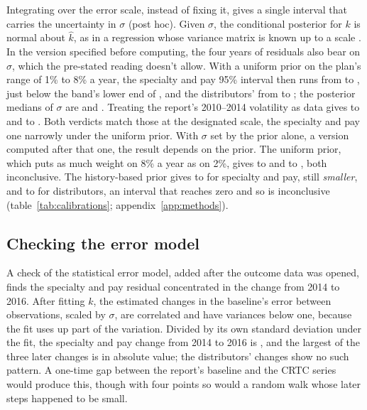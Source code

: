 Integrating over the error scale, instead of fixing it, gives a single interval that carries the uncertainty in \(\sigma\) (post hoc). Given \(\sigma\), the conditional posterior for \(k\) is normal about \(\hat k\), as in a regression whose variance matrix is known up to a scale \citep[372]{GelmanBDA3}. In the version specified before computing, the four years of residuals also bear on \(\sigma\), which the pre-stated reading doesn't allow. With a uniform prior on the plan's range of 1\% to 8\% a year, the specialty and pay 95\% interval then runs from \lttvKIntSpecUnifLo{} to \lttvKIntSpecUnifHi{}, just below the band's lower end of \lttvBandSpecLo{}, and the distributors' from \lttvKIntBDUUnifLo{} to \lttvKIntBDUUnifHi{}; the posterior medians of \(\sigma\) are \lttvKIntSpecUnifSigmaMed{} and \lttvKIntBDUUnifSigmaMed{}. Treating the report's 2010--2014 volatility as data gives \lttvKIntSpecHistLo{} to \lttvKIntSpecHistHi{} and \lttvKIntBDUHistLo{} to \lttvKIntBDUHistHi{}. Both verdicts match those at the designated scale, the specialty and pay one narrowly under the uniform prior. With \(\sigma\) set by the prior alone, a version computed after that one, the result depends on the prior. The uniform prior, which puts as much weight on 8\% a year as on 2\%, gives \lttvKIntSpecUnifOnlyLo{} to \lttvKIntSpecUnifOnlyHi{} and \lttvKIntBDUUnifOnlyLo{} to \lttvKIntBDUUnifOnlyHi{}, both inconclusive. The history-based prior gives \lttvKIntSpecHistOnlyLo{} to \lttvKIntSpecHistOnlyHi{} for specialty and pay, still \emph{smaller}, and \lttvKIntBDUHistOnlyLo{} to \lttvKIntBDUHistOnlyHi{} for distributors, an interval that reaches zero and so is inconclusive (table~\ref{tab:calibrations}; appendix~\ref{app:methods}).

\subsection{Checking the error model}
\label{sec:lttv-modelcheck}

A check of the statistical error model, added after the outcome data was opened, finds the specialty and pay residual concentrated in the change from 2014 to 2016. After fitting \(k\), the estimated changes in the baseline's error between observations, scaled by \(\sigma\), are correlated and have variances below one, because the fit uses up part of the variation. Divided by its own standard deviation under the fit, the specialty and pay change from 2014 to 2016 is \lttvInnovSpecFirst{}, and the largest of the three later changes is \lttvInnovSpecLaterMax{} in absolute value; the distributors' changes show no such pattern. A one-time gap between the report's baseline and the CRTC series would produce this, though with four points so would a random walk whose later steps happened to be small.

